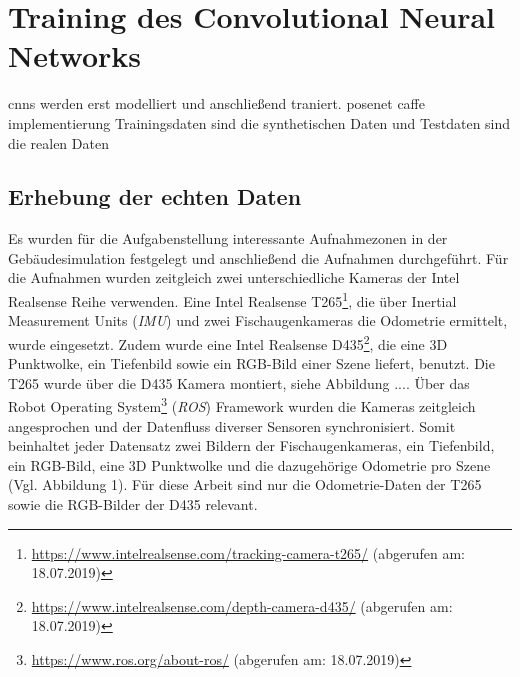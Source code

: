 
\section{Training des Convolutional Neural Networks}
cnns werden erst modelliert und anschließend traniert.
posenet caffe implementierung
Trainingsdaten sind die synthetischen Daten und Testdaten sind die realen Daten

\subsection{Erhebung der echten Daten}
Es wurden für die Aufgabenstellung interessante Aufnahmezonen in der Gebäudesimulation festgelegt und anschließend die Aufnahmen durchgeführt. Für die Aufnahmen wurden zeitgleich zwei unterschiedliche Kameras der Intel Realsense Reihe verwenden. Eine Intel Realsense T265\footnote{\url{https://www.intelrealsense.com/tracking-camera-t265/} (abgerufen am: 18.07.2019)}, die über Inertial Measurement Units (\textit{IMU}) und zwei Fischaugenkameras die Odometrie ermittelt, wurde eingesetzt. Zudem wurde eine Intel Realsense D435\footnote{ \url{https://www.intelrealsense.com/depth-camera-d435/} (abgerufen am: 18.07.2019)}, die eine 3D Punktwolke, ein Tiefenbild sowie ein RGB-Bild einer Szene liefert, benutzt. Die T265 wurde über die D435 Kamera montiert, siehe Abbildung .... Über das Robot Operating System\footnote{\url{https://www.ros.org/about-ros/} (abgerufen am: 18.07.2019)} (\textit{ROS}) Framework wurden die Kameras zeitgleich angesprochen und der Datenfluss diverser Sensoren synchronisiert. Somit beinhaltet jeder Datensatz zwei Bildern der Fischaugenkameras, ein Tiefenbild, ein RGB-Bild, eine 3D Punktwolke und die dazugehörige Odometrie pro Szene (Vgl. Abbildung 1). Für diese Arbeit sind nur die Odometrie-Daten der T265 sowie die RGB-Bilder der D435 relevant.



